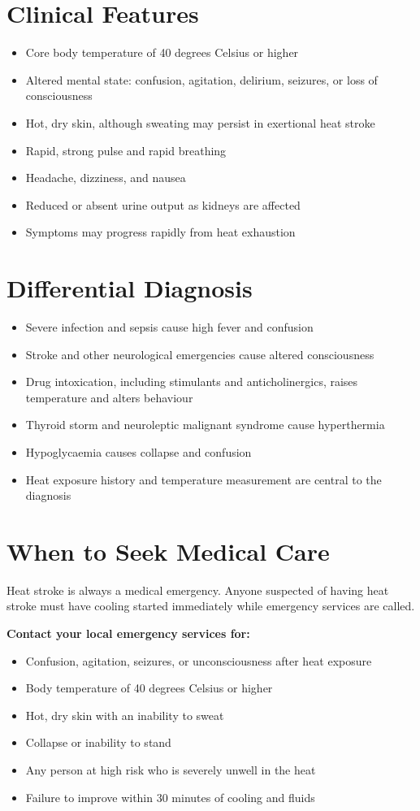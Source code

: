 \section*{Clinical Features}
\begin{itemize}
    \item Core body temperature of 40 degrees Celsius or higher
    \item Altered mental state: confusion, agitation, delirium, seizures, or loss of consciousness
    \item Hot, dry skin, although sweating may persist in exertional heat stroke
    \item Rapid, strong pulse and rapid breathing
    \item Headache, dizziness, and nausea
    \item Reduced or absent urine output as kidneys are affected
    \item Symptoms may progress rapidly from heat exhaustion
\end{itemize}

\section*{Differential Diagnosis}
\begin{itemize}
    \item Severe infection and sepsis cause high fever and confusion
    \item Stroke and other neurological emergencies cause altered consciousness
    \item Drug intoxication, including stimulants and anticholinergics, raises temperature and alters behaviour
    \item Thyroid storm and neuroleptic malignant syndrome cause hyperthermia
    \item Hypoglycaemia causes collapse and confusion
    \item Heat exposure history and temperature measurement are central to the diagnosis
\end{itemize}

\section*{When to Seek Medical Care}
Heat stroke is always a medical emergency. Anyone suspected of having heat stroke must have cooling started immediately while emergency services are called.

\textbf{Contact your local emergency services for:}
\begin{itemize}
    \item Confusion, agitation, seizures, or unconsciousness after heat exposure
    \item Body temperature of 40 degrees Celsius or higher
    \item Hot, dry skin with an inability to sweat
    \item Collapse or inability to stand
    \item Any person at high risk who is severely unwell in the heat
    \item Failure to improve within 30 minutes of cooling and fluids
\end{itemize}

